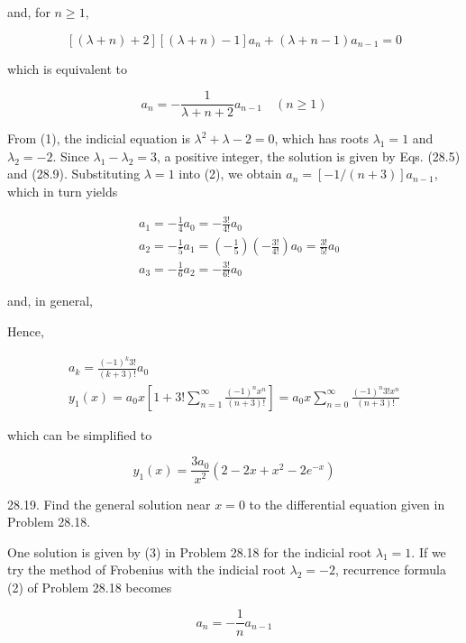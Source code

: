 \documentclass[10pt]{article}
\begin{document}
and, for $n \geq 1$,

$$
[(\lambda+n)+2][(\lambda+n)-1] a_{n}+(\lambda+n-1) a_{n-1}=0
$$

which is equivalent to


\begin{equation*}
a_{n}=-\frac{1}{\lambda+n+2} a_{n-1} \quad(n \geq 1) \tag{2}
\end{equation*}


From (1), the indicial equation is $\lambda^{2}+\lambda-2=0$, which has roots $\lambda_{1}=1$ and $\lambda_{2}=-2$. Since $\lambda_{1}-\lambda_{2}=3$, a positive integer, the solution is given by Eqs. (28.5) and (28.9). Substituting $\lambda=1$ into (2), we obtain $a_{n}=[-1 /(n+3)] a_{n-1}$, which in turn yields

$$
\begin{aligned}
& a_{1}=-\frac{1}{4} a_{0}=-\frac{3 !}{4 !} a_{0} \\
& a_{2}=-\frac{1}{5} a_{1}=\left(-\frac{1}{5}\right)\left(-\frac{3 !}{4 !}\right) a_{0}=\frac{3 !}{5 !} a_{0} \\
& a_{3}=-\frac{1}{6} a_{2}=-\frac{3 !}{6 !} a_{0}
\end{aligned}
$$

and, in general,

Hence,

$$
\begin{gathered}
a_{k}=\frac{(-1)^{k} 3 !}{(k+3) !} a_{0} \\
y_{1}(x)=a_{0} x\left[1+3 ! \sum_{n=1}^{\infty} \frac{(-1)^{n} x^{n}}{(n+3) !}\right]=a_{0} x \sum_{n=0}^{\infty} \frac{(-1)^{n} 3 ! x^{n}}{(n+3) !}
\end{gathered}
$$

which can be simplified to


\begin{equation*}
y_{1}(x)=\frac{3 a_{0}}{x^{2}}\left(2-2 x+x^{2}-2 e^{-x}\right) \tag{3}
\end{equation*}


28.19. Find the general solution near $x=0$ to the differential equation given in Problem 28.18.

One solution is given by (3) in Problem 28.18 for the indicial root $\lambda_{1}=1$. If we try the method of Frobenius with the indicial root $\lambda_{2}=-2$, recurrence formula (2) of Problem 28.18 becomes


\begin{equation*}
a_{n}=-\frac{1}{n} a_{n-1} \tag{1}
\end{equation*}
\end{document}
